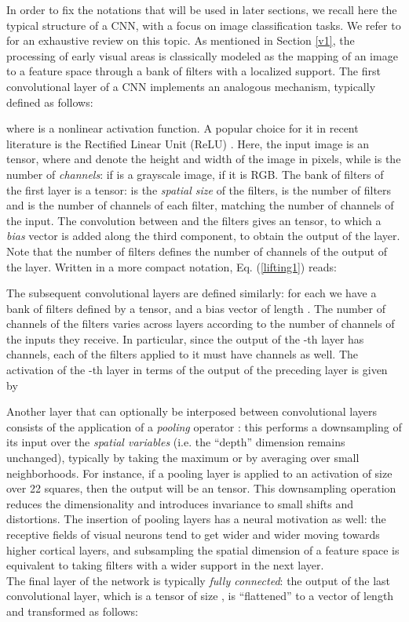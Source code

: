 \documentclass[11pt,oneside,reqno]{amsart}
\begin{document}
 In order to fix the notations that will be used in later sections, we recall here the typical structure of a CNN, with a focus on image classification tasks. We refer to \citet{rawatwang} for an exhaustive review on this topic. As mentioned in Section \ref{v1}, the processing of early visual areas is classically modeled as the mapping of an image to a feature space through a bank of filters with a localized support. The first convolutional layer of a CNN implements an analogous mechanism, typically  defined as follows:
 
 where  is a nonlinear activation function. A popular choice for it in recent literature is the Rectified Linear Unit (ReLU)  \citep{relu,krizhevsky}. Here, the input image  is an  tensor, where  and  denote the height and width of the image in pixels, while  is the number of \emph{channels}:  if  is a grayscale image,  if it is RGB. The bank of filters  of the first layer is a  tensor:  is the \emph{spatial size} of the filters,  is the number of filters and  is the number of channels of each filter, matching the number of channels of the input. The convolution between  and the filters  gives an  tensor, to which a \emph{bias} vector  is added along the third component, to obtain the output  of the layer. Note that the number of filters  defines the number of channels of the output of the layer. Written in a more compact notation, Eq. (\ref{lifting1}) reads:
 
 The subsequent convolutional layers are defined similarly: for each  we have a bank of filters  defined by a  tensor, and a bias vector  of length . The number of channels of the filters varies across layers according to the number of channels of the inputs they receive. In particular, since the output  of the -th layer has  channels, each of the filters  applied to it must have  channels as well. The activation of the -th layer in terms of the output  of the preceding layer is given by
 
 Another layer that can optionally be interposed between convolutional layers consists of the application of a \emph{pooling} operator : this performs a downsampling of its input over the \emph{spatial variables} (i.e. the ``depth'' dimension remains unchanged), typically by taking the maximum or by averaging over small neighborhoods. For instance, if a pooling layer is applied to an activation  of size  over 22 squares, then the output  will be an  tensor. This downsampling operation reduces the dimensionality and introduces invariance to small shifts and distortions. The insertion of pooling layers has a neural motivation as well: the receptive fields of visual neurons tend to get wider and wider moving towards higher cortical layers, and subsampling the spatial dimension of a feature space is equivalent to taking filters with a wider support in the next layer.\\
 The final layer of the network is typically \emph{fully connected}: the output  of the last convolutional layer, which is a tensor of size , is ``flattened'' to a vector  of length  and transformed as follows:
 
\end{document}
